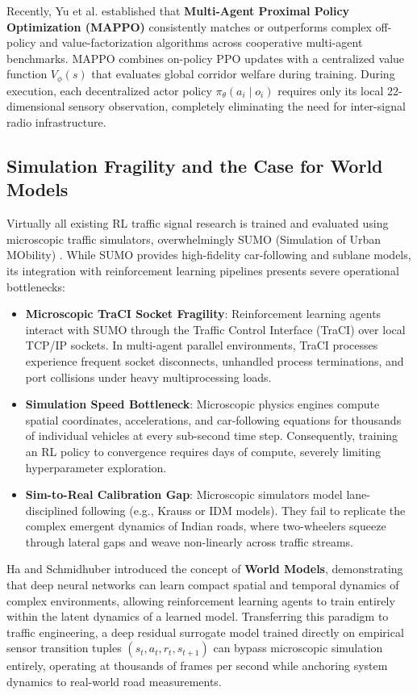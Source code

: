 Recently, Yu et al. \cite{ref_mappo2022} established that \textbf{Multi-Agent Proximal Policy Optimization (MAPPO)} consistently matches or outperforms complex off-policy and value-factorization algorithms across cooperative multi-agent benchmarks. MAPPO combines on-policy PPO updates with a centralized value function $V_\phi(s)$ that evaluates global corridor welfare during training. During execution, each decentralized actor policy $\pi_\theta(a_i \mid o_i)$ requires only its local 22-dimensional sensory observation, completely eliminating the need for inter-signal radio infrastructure.

\subsection{Simulation Fragility and the Case for World Models}
Virtually all existing RL traffic signal research is trained and evaluated using microscopic traffic simulators, overwhelmingly SUMO (Simulation of Urban MObility) \cite{ref_sumo2018}. While SUMO provides high-fidelity car-following and sublane models, its integration with reinforcement learning pipelines presents severe operational bottlenecks:
\begin{itemize}
    \item \textbf{Microscopic TraCI Socket Fragility}: Reinforcement learning agents interact with SUMO through the Traffic Control Interface (TraCI) over local TCP/IP sockets. In multi-agent parallel environments, TraCI processes experience frequent socket disconnects, unhandled process terminations, and port collisions under heavy multiprocessing loads.
    \item \textbf{Simulation Speed Bottleneck}: Microscopic physics engines compute spatial coordinates, accelerations, and car-following equations for thousands of individual vehicles at every sub-second time step. Consequently, training an RL policy to convergence requires days of compute, severely limiting hyperparameter exploration.
    \item \textbf{Sim-to-Real Calibration Gap}: Microscopic simulators model lane-disciplined following (e.g., Krauss or IDM models). They fail to replicate the complex emergent dynamics of Indian roads, where two-wheelers squeeze through lateral gaps and weave non-linearly across traffic streams.
\end{itemize}

Ha and Schmidhuber \cite{ref_worldmodels2018} introduced the concept of \textbf{World Models}, demonstrating that deep neural networks can learn compact spatial and temporal dynamics of complex environments, allowing reinforcement learning agents to train entirely within the latent dynamics of a learned model. Transferring this paradigm to traffic engineering, a deep residual surrogate model trained directly on empirical sensor transition tuples $(s_t, a_t, r_t, s_{t+1})$ can bypass microscopic simulation entirely, operating at thousands of frames per second while anchoring system dynamics to real-world road measurements.

